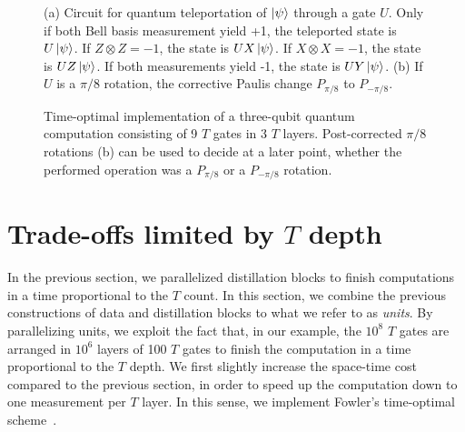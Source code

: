 \documentclass[prx,aps,letterpaper,twocolumn,allowfontchageintitle=true,accepted=2019-02-01]{quantumarticle}
\begin{document}
\begin{figure}[b!]
\centering
\def\svgwidth{\linewidth}

\caption{(a) Circuit for quantum teleportation of $\ket{\psi}$ through a gate $U$. Only if both Bell basis measurement yield +1, the teleported state is $U\ket{\psi}$. If $Z\otimes Z=-1$, the state is $UX\ket{\psi}$. If $X\otimes X=-1$, the state is $UZ \ket{\psi}$. If both measurements yield -1, the state is $UY\ket{\psi}$. (b) If $U$ is a $\pi/8$ rotation, the corrective Paulis change $P_{\pi/8}$ to $P_{-\pi/8}$. }
\label{fig:teleportationcircuit}
\end{figure}

\begin{figure}[t!]
\centering
\def\svgwidth{\linewidth}

\caption{Time-optimal implementation of a three-qubit quantum computation consisting of 9 $T$ gates in 3 $T$ layers.  Post-corrected $\pi/8$ rotations (b) can be used to decide at a later point, whether the performed operation was a $P_{\pi/8}$ or a $P_{-\pi/8}$ rotation.}
\label{fig:timeoptimalcircuit}
\end{figure}

\section{Trade-offs limited by $T$ depth}
\label{sec:timeoptimal}

In the previous section, we parallelized distillation blocks to finish computations in a time proportional to the $T$ count. In this section, we combine the previous constructions of data and distillation blocks to what we refer to as \textit{units}.
By parallelizing units, we exploit the fact that, in our example, the $10^8$ $T$ gates are arranged in $10^6$ layers of 100 $T$ gates to finish the computation in a time proportional to the $T$ depth. We first slightly increase the space-time cost compared to the previous section, in order to speed up the computation down to one measurement per $T$ layer. In this sense, we implement Fowler's time-optimal scheme~\cite{Fowler2012a}.
\end{document}
